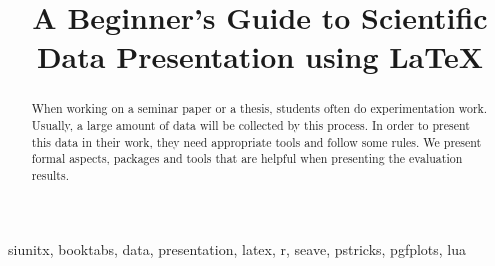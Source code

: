 \documentclass[conference,a4paper,english]{IEEEtran}
\begin{document}
\title{A Beginner's Guide to Scientific Data Presentation using \LaTeX}

\author{
  }

\maketitle

\begin{abstract}
  When working on a seminar paper or a thesis, students often do experimentation
  work. Usually, a large amount of data will be collected by this process. In
  order to present this data in their work, they need appropriate tools and
  follow some rules. We present formal aspects, packages and tools that are
  helpful when presenting the evaluation results.
\end{abstract}
\begin{IEEEkeywords}
  siunitx, booktabs, data, presentation, latex, r, seave, pstricks, pgfplots,
  lua
\end{IEEEkeywords}













%
%
%
\printbibliography

\end{document}
